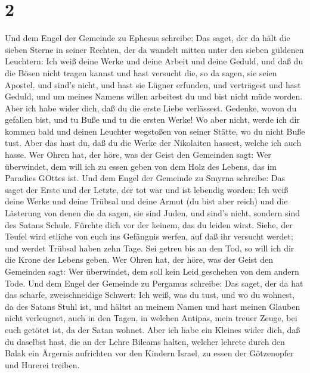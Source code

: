 \hypertarget{section}{%
\section{2}\label{section}}

 Und dem Engel der Gemeinde zu Ephesus schreibe: Das saget,
der da hält die sieben Sterne in seiner Rechten, der da wandelt mitten
unter den sieben güldenen Leuchtern:  Ich weiß deine Werke
und deine Arbeit und deine Geduld, und daß du die Bösen nicht tragen
kannst und hast versucht die, so da sagen, sie seien Apostel, und sind's
nicht, und hast sie Lügner erfunden,  und verträgest und
hast Geduld, und um meines Namens willen arbeitest du und bist nicht
müde worden.  Aber ich habe wider dich, daß du die erste
Liebe verlässest.  Gedenke, wovon du gefallen bist, und tu
Buße und tu die ersten Werke! Wo aber nicht, werde ich dir kommen bald
und deinen Leuchter wegstoßen von seiner Stätte, wo du nicht Buße tust.
 Aber das hast du, daß du die Werke der Nikolaiten hassest,
welche ich auch hasse.  Wer Ohren hat, der höre, was der
Geist den Gemeinden sagt: Wer überwindet, dem will ich zu essen geben
von dem Holz des Lebens, das im Paradies GOttes ist.  Und
dem Engel der Gemeinde zu Smyrna schreibe: Das saget der Erste und der
Letzte, der tot war und ist lebendig worden:  Ich weiß deine
Werke und deine Trübsal und deine Armut (du bist aber reich) und die
Lästerung von denen die da sagen, sie sind Juden, und sind's nicht,
sondern sind des Satans Schule.  Fürchte dich vor der
keinem, das du leiden wirst. Siehe, der Teufel wird etliche von euch ins
Gefängnis werfen, auf daß ihr versucht werdet; und werdet Trübsal haben
zehn Tage. Sei getreu bis an den Tod, so will ich dir die Krone des
Lebens geben.  Wer Ohren hat, der höre, was der Geist den
Gemeinden sagt: Wer überwindet, dem soll kein Leid geschehen von dem
andern Tode.  Und dem Engel der Gemeinde zu Pergamus
schreibe: Das saget, der da hat das scharfe, zweischneidige Schwert:
 Ich weiß, was du tust, und wo du wohnest, da des Satans
Stuhl ist, und hältst an meinem Namen und hast meinen Glauben nicht
verleugnet, auch in den Tagen, in welchen Antipas, mein treuer Zeuge,
bei euch getötet ist, da der Satan wohnet.  Aber ich habe
ein Kleines wider dich, daß du daselbst hast, die an der Lehre Bileams
halten, welcher lehrete durch den Balak ein Ärgernis aufrichten vor den
Kindern Israel, zu essen der Götzenopfer und Hurerei treiben.
